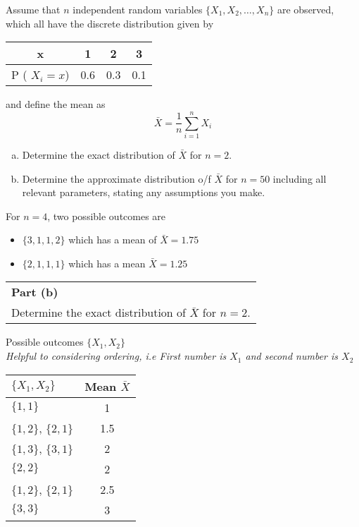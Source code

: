 \documentclass[a4paper,12pt]{article}
\begin{document}
\large
\noindent Assume that $n$ independent random variables $\{X_1 , X_2 , \ldots , X_n\}$ are observed, which all
have the discrete distribution given by
\begin{center}
\begin{tabular}{|c|c|c|c|} \hline
x & 1 & 2 & 3 \\ \hline
P ( $X_i = x $) & 0.6 & 0.3&  0.1\\ \hline
\end{tabular}
\end{center}
and define the mean as 
\[ \bar{X} = \frac{1}{n} \sum ^{n}_{i=1} X_i\]

\begin{enumerate}[(a)]
\item %
Determine the exact distribution of $\bar{X}$ for $n = 2$.
\item %
Determine the approximate distribution o/f $\bar{X}$ for $n = 50$ including all relevant
parameters, stating any assumptions you make.
\end{enumerate}
\large
\begin{framed}
For $n=4$, two possible outcomes are

\begin{itemize}
    \item  $\{3,1,1,2\}$ which has a mean of $\bar{X} = 1.75$
    \item $\{2,1,1,1\}$ which has a mean $\bar{X} = 1.25$
\end{itemize}

\end{framed}


\newpage
\begin{table}[ht!]
 \centering
 \begin{tabular}{|p{15cm}|}
 \hline  \large
 \noindent \textbf{Part (b)}\\ \large
Determine the exact distribution of $\bar{X}$ for $n = 2$.
 \\ \hline
  \end{tabular}
\end{table}

\noindent Possible outcomes $\{ X_1,X_2\}$ \\

\noindent \textit{Helpful to considering ordering, i.e First number is ${X_1}$ and second number is ${X_2}$ }
\begin{center}
\begin{tabular}{|l|c|}
\hline
 $\{X_1, X_2\}$ & Mean $\bar{X}$\\ \hline
$\{1 , 1\}$ & 1\\ \hline
$\{1 , 2\}$, $\{2 , 1\}$  & 1.5 \\ \hline
$\{1 , 3\}$, $\{3 , 1\}$  & 2 \\ \hline
$\{2 , 2\}$ & 2 \\ \hline
$\{1 , 2\}$, $\{2 , 1\}$ & 2.5 \\ \hline
$\{3 , 3\}$ & 3 \\ \hline
\end{tabular}
\end{center}
\end{document}
